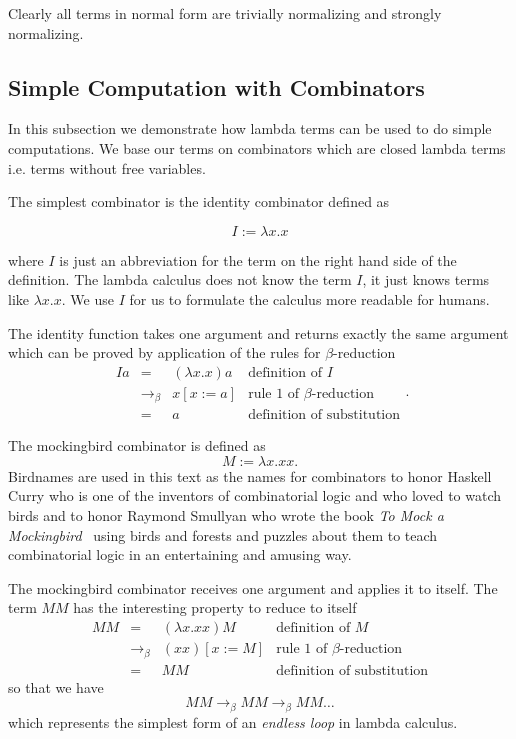 Clearly all terms in normal form are trivially normalizing and strongly
normalizing.




\subsection{Simple Computation with Combinators}

In this subsection we demonstrate how lambda terms can be used to do simple
computations. We base our terms on combinators which are closed lambda terms
i.e. terms without free variables.

The simplest combinator is the identity combinator defined as

$$ I := \lambda x.x $$

where $I$ is just an abbreviation for the term on the right hand side of the
definition. The lambda calculus does not know the term $I$, it just knows
terms like $\lambda x.x$. We use $I$ for us to formulate the calculus more
readable for humans.

The identity function takes one argument and returns exactly the same
argument which can be proved by application of the rules for
$\beta$-reduction
$$\begin{array}{llll}
  I a & = &  (\lambda x.x) a & \text{definition of $I$} \\
       & \to_\beta & x[x:=a]  & \text{rule 1 of $\beta$-reduction} \\
       & =              & a           & \text{definition of substitution}
\end{array}.$$

The mockingbird combinator is defined as
$$ M := \lambda x. x x.$$
Birdnames are used in this text as the names for combinators to honor Haskell
Curry who is one of the inventors of combinatorial logic and who loved to
watch birds and to honor Raymond Smullyan who wrote the book \emph{To Mock a
  Mockingbird}~\cite{smullyan} using birds and forests and puzzles about them
to teach combinatorial logic in an entertaining and amusing way.

The mockingbird combinator receives one argument and applies it to itself. The
term $M M$ has the interesting property to reduce to itself
$$\begin{array}{llll}
  M M & = &  (\lambda x.x x) M  & \text{definition of $M$} \\
       & \to_\beta & (x x)[x:=M]   & \text{rule 1 of $\beta$-reduction} \\
       & =              & M M              & \text{definition of substitution}
\end{array}$$
so that we have
$$ MM \to_\beta MM \to_\beta MM \ldots$$
which represents the simplest form of an \emph{endless loop} in lambda
calculus.

